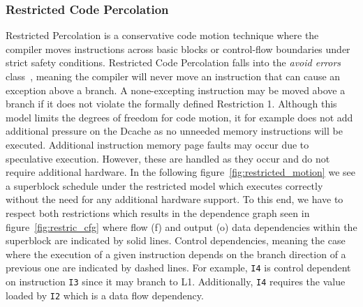 \subsubsection{Restricted Code Percolation}
\label{rest_code_per}
Restricted Percolation is a conservative code motion technique where the compiler moves instructions across basic blocks or control-flow boundaries under strict safety conditions. Restricted Code Percolation falls into the \textit{avoid errors} class~\cite{bringmannMH95}, meaning the compiler will never move an instruction that can cause an exception above a branch. A none-excepting instruction may be moved above a branch if it does not violate the formally defined Restriction 1. Although this model limits the degrees of freedom for code motion, it for example does not add additional pressure on the Dcache as no unneeded memory instructions will be executed. Additional instruction memory page faults may occur due to speculative execution. However, these are handled as they occur and do not require additional hardware.  In the following figure~\ref{fig:restricted_motion} we see a superblock schedule under the restricted model which executes correctly without the need for any additional hardware support. To this end, we have to respect both restrictions which results in the dependence graph seen in figure~\ref{fig:restric_cfg} where flow (f) and output (o) data dependencies within the superblock are indicated by solid lines. Control dependencies, meaning the case where the execution of a given instruction depends on the branch direction of a previous one are indicated by dashed lines. For example, \texttt{I4} is control dependent on instruction \texttt{I3} since it may branch to L1. Additionally, \texttt{I4} requires the value loaded by \texttt{I2} which is a data flow dependency.

